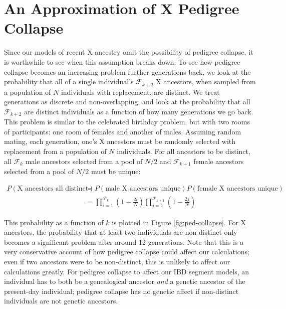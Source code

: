 \documentclass[11pt]{article}
\begin{document}
\section{An Approximation of X Pedigree Collapse}
\label{ap:ped-collapse}

Since our models of recent X ancestry omit the possibility of pedigree
collapse, it is worthwhile to see when this assumption breaks down. To see how
pedigree collapse becomes an increasing problem further generations back, we
look at the probability that all of a single individual's $\mathcal{F}_{k+2}$ X
ancestors, when sampled from a population of $N$ individuals with replacement,
are distinct. We treat generations as discrete and non-overlapping, and look at
the probability that all $\mathcal{F}_{k+2}$ are distinct individuals as a
function of how many generations we go back. This problem is similar to the
celebrated birthday problem, but with two rooms of participants: one room of
females and another of males. Assuming random mating, each generation, one's X
ancestors must be randomly selected with replacement from a population of $N$
individuals. For all ancestors to be distinct, all $\mathcal{F}_{k}$ male
ancestors selected from a pool of $N/2$ and $\mathcal{F}_{k+1}$ female
ancestors selected from a pool of $N/2$ must be unique:

\begin{align}
  P(\text{X ancestors all distinct}) &= P(\text{male X ancestors unique}) P(\text{female X ancestors unique})\\
                                     &= \prod_{i=1}^{\mathcal{F}_{k}} \left(1-\frac{2i}{N}\right)\prod_{j=1}^{\mathcal{F}_{k+1}} \left(1-\frac{2j}{N}\right)
\end{align}

This probability as a function of $k$ is plotted in Figure
\ref{fig:ped-collapse}. For X ancestors, the probability that at least two
individuals are non-distinct only becomes a significant problem after around 12
generations. Note that this is a very conservative account of how pedigree
collapse could affect our calculations; even if two ancestors were to be
non-distinct, this is unlikely to affect our calculations greatly. For pedigree
collapse to affect our IBD segment models, an individual has to both be a
genealogical ancestor \emph{and} a genetic ancestor of the present-day
individual; pedigree collapse has no genetic affect if non-distinct individuals
are not genetic ancestors.
\end{document}
